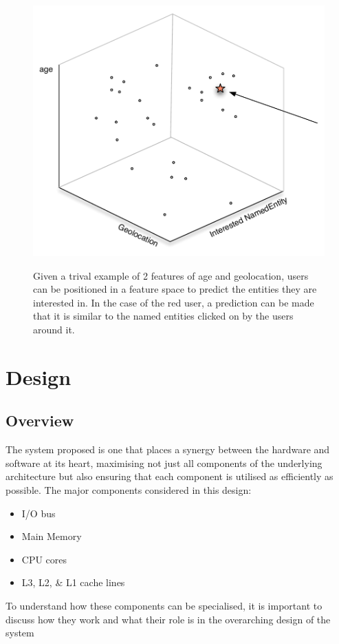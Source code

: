 \documentclass[a4paper,11pt]{scrreprt}
\begin{document}
\begin{figure}[h]
\centering
\caption{Given a trival example of 2 features of age and geolocation, users can be positioned in a feature space to predict the entities they are interested in. In the case of the red user, a prediction can be made that it is similar to the named entities clicked on by the users around it.}
\includegraphics[scale=0.65, trim=0 10 0 0, clip=true] {featurespace.pdf}
\label{fig:featurespace}
\end{figure}

\chapter{Design}
\section{Overview}
The system proposed is one that places a synergy between the hardware and software at its heart, maximising not just all components of the underlying architecture but also ensuring that each component is utilised as efficiently as possible. The major components considered in this design:
\begin{itemize}
\item I/O bus
\item Main Memory
\item CPU cores
\item L3, L2, \& L1 cache lines
\end{itemize}
To understand how these components can be specialised, it is important to discuss how they work and what their role is in the overarching design of the system 
\end{document}
